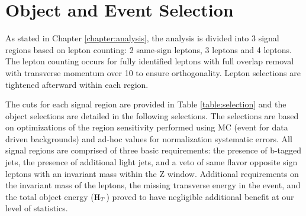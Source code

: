 \chapter[Object and Event Selection][Object and Event Selection]{Object and Event Selection}
\label{chapter:selection}

As stated in Chapter \ref{chapter:analysis}, the analysis is divided into 3 signal regions based
on lepton counting: 2 same-sign leptons, 3 leptons and 4 leptons. The lepton
counting occurs for fully identified leptons with full overlap removal with
transverse momentum over 10 \gev to ensure orthogonality. Lepton selections are tightened
afterward within each region.

The cuts for each signal region are provided in Table \ref{table:selection} and the object selections are detailed in the
following selections. The selections are based on optimizations of the region sensitivity
performed using MC (event for data driven backgrounds) and ad-hoc values for normalization systematic errors.
All signal regions are comprised of three basic requirements: the presence of b-tagged
jets, the presence of additional light jets, and a veto of same flavor opposite sign leptons with an
invariant mass within the Z window. Additional requirements on the invariant mass of the leptons, the missing transverse energy
in the event, and the total object energy ($\rm H_{T}$) proved to have negligible additional benefit at our level of 
statistics.

